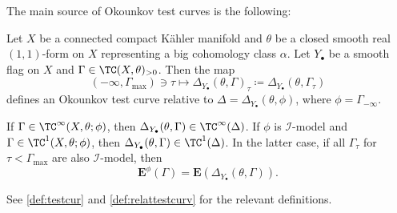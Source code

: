 The main source of Okounkov test curves is the following:
\begin{theorem}\label{thm:Okountescurvex}
Let $X$ be a connected compact Kähler manifold and $\theta$ be a closed smooth real $(1,1)$-form on $X$ representing a big cohomology class $\alpha$.
    Let $Y_{\bullet}$ be a smooth flag on $X$ and $\Gamma\in \TC(X,\theta)_{>0}$.
    Then the map
    \[
    (-\infty,\Gamma_{\max})\ni \tau\mapsto \Delta_{Y_{\bullet}}(\theta,\Gamma)_{\tau}\coloneqq \Delta_{Y_{\bullet}}(\theta,\Gamma_{\tau})
    \]
    defines an Okounkov test curve relative to $\Delta=\Delta_{Y_{\bullet}}(\theta,\phi)$, where $\phi=\Gamma_{-\infty}$.

    If $\Gamma\in\TC^{\infty}(X,\theta;\phi)$, then $\Delta_{Y_{\bullet}}(\theta,\Gamma)\in\TC^{\infty}(\Delta)$. If $\phi$ is $\mathcal I$-model and $\Gamma\in\TC^1(X,\theta;\phi)$, then $\Delta_{Y_{\bullet}}(\theta,\Gamma)\in\TC^1(\Delta)$. In the latter case, if all $\Gamma_\tau$ for $\tau<\Gamma_{\max}$ are also $\mathcal I$-model, then
    \[
        \mathbf{E}^{\phi}(\Gamma)=\mathbf{E}(\Delta_{Y_{\bullet}}(\theta,\Gamma)).
    \]
\end{theorem}
See \cref{def:testcur} and \cref{def:relattestcurv} for the relevant definitions.
